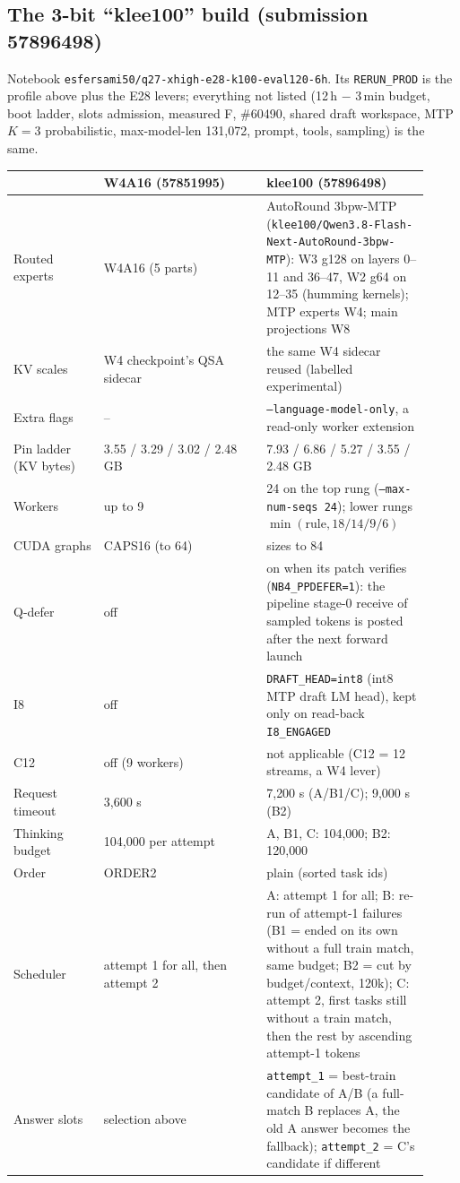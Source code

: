 \subsection{The 3-bit ``klee100'' build (submission 57896498)}
Notebook \texttt{esfersami50/q27-xhigh-e28-k100-eval120-6h}. Its \texttt{RERUN\_PROD} is the profile above plus the E28 levers; everything not listed (12\,h $-$ 3\,min budget, boot ladder, slots admission, measured F, \#60490, shared draft workspace, MTP $K=3$ probabilistic, max-model-len 131{,}072, prompt, tools, sampling) is the same.
\begin{center}\small
\begin{tabular}{@{}p{0.2\linewidth}p{0.36\linewidth}p{0.36\linewidth}@{}}
\toprule
 & W4A16 (57851995) & klee100 (57896498) \\
\midrule
Routed experts & W4A16 (5 parts) & AutoRound 3bpw-MTP (\texttt{klee100/Qwen3.8-Flash-Next-AutoRound-3bpw-MTP}): W3 g128 on layers 0--11 and 36--47, W2 g64 on 12--35 (humming kernels); MTP experts W4; main projections W8 \\
KV scales & W4 checkpoint's QSA sidecar & the same W4 sidecar reused (labelled experimental) \\
Extra flags & -- & \texttt{--language-model-only}, a read-only worker extension \\
Pin ladder (KV bytes) & 3.55 / 3.29 / 3.02 / 2.48 GB & 7.93 / 6.86 / 5.27 / 3.55 / 2.48 GB \\
Workers & up to 9 & 24 on the top rung (\texttt{--max-num-seqs 24}); lower rungs $\min(\text{rule}, 18 / 14 / 9 / 6)$ \\
CUDA graphs & CAPS16 (to 64) & sizes to 84 \\
Q-defer & off & on when its patch verifies (\texttt{NB4\_PPDEFER=1}): the pipeline stage-0 receive of sampled tokens is posted after the next forward launch \\
I8 & off & \texttt{DRAFT\_HEAD=int8} (int8 MTP draft LM head), kept only on read-back \texttt{I8\_ENGAGED} \\
C12 & off (9 workers) & not applicable (C12 = 12 streams, a W4 lever) \\
Request timeout & 3{,}600 s & 7{,}200 s (A/B1/C); 9{,}000 s (B2) \\
Thinking budget & 104{,}000 per attempt & A, B1, C: 104{,}000; B2: 120{,}000 \\
Order & ORDER2 & plain (sorted task ids) \\
Scheduler & attempt 1 for all, then attempt 2 & A: attempt 1 for all; B: re-run of attempt-1 failures (B1 = ended on its own without a full train match, same budget; B2 = cut by budget/context, 120k); C: attempt 2, first tasks still without a train match, then the rest by ascending attempt-1 tokens \\
Answer slots & selection above & \texttt{attempt\_1} = best-train candidate of A/B (a full-match B replaces A, the old A answer becomes the fallback); \texttt{attempt\_2} = C's candidate if different \\
\bottomrule
\end{tabular}
\end{center}
